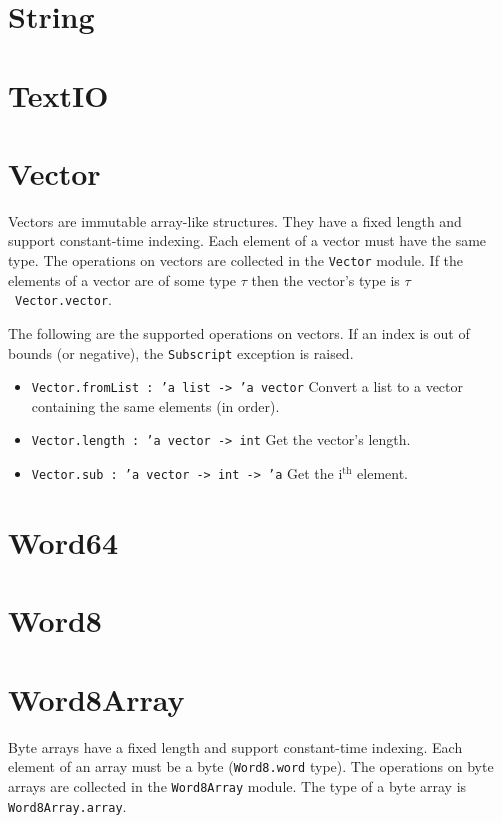 \documentclass[12pt,a4paper]{book}
\begin{document}
\section{String}
\label{sect:string}

\section{TextIO}
\label{sect:textio}


\section{Vector}
\label{sect:vector}

Vectors are immutable array-like structures. They have a fixed length and support constant-time indexing. Each element of a vector must have the same type. The operations on vectors are collected in the \texttt{Vector} module. If the elements of a vector are of some type $\tau$ then the vector's type is $\tau$\ \texttt{Vector.vector}.

The following are the supported operations on vectors. If an index is out of bounds (or negative), the \texttt{Subscript} exception is raised.
\begin{itemize}
\item \texttt{Vector.fromList : 'a list -> 'a vector} Convert a list to a vector containing the same elements (in order).
\item \texttt{Vector.length : 'a vector -> int} Get the vector's length.
\item \texttt{Vector.sub : 'a vector -> int -> 'a} Get the i$^\textrm{th}$ element.
\end{itemize}

\section{Word64}
\label{sect:word64}

\section{Word8}
\label{sect:word8}

\section{Word8Array}
Byte arrays have a fixed length and support constant-time indexing. Each element of an array must be a byte (\texttt{Word8.word} type). The operations on byte arrays are collected in the \texttt{Word8Array} module. The type of a byte array is \texttt{Word8Array.array}.
\end{document}
